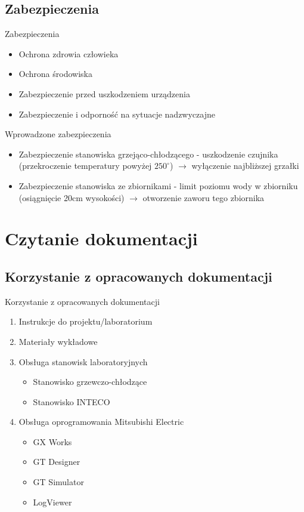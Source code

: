 \documentclass{beamer}
\begin{document}
	\subsection{Zabezpieczenia}
	\begin{frame}{Zabezpieczenia}
		\begin{itemize}
			\item Ochrona zdrowia człowieka
			\item Ochrona środowiska
			\item Zabezpieczenie przed uszkodzeniem urządzenia
			\item Zabezpieczenie i odporność na sytuacje nadzwyczajne
		\end{itemize}
		\begin{block}{Wprowadzone zabezpieczenia}
			\begin{itemize}
				\item Zabezpieczenie stanowiska grzejąco-chłodzącego - uszkodzenie czujnika (przekroczenie temperatury powyżej $250^\circ$) $\rightarrow$ wyłączenie najbliższej grzałki
				\item Zabezpieczenie stanowiska ze zbiornikami - limit poziomu wody w zbiorniku (osiągnięcie 20cm wysokości) $\rightarrow$ otworzenie zaworu tego zbiornika
			\end{itemize}
		\end{block}
	\end{frame}

\section{Czytanie dokumentacji}

	\subsection{Korzystanie z opracowanych dokumentacji}
	\begin{frame}{Korzystanie z opracowanych dokumentacji}
		\begin{enumerate}
			\item Instrukcje do projektu/laboratorium
			\item Materiały wykładowe
			\item Obsługa stanowisk laboratoryjnych
			\begin{itemize}
				\item Stanowisko grzewczo-chłodzące
				\item Stanowisko INTECO
			\end{itemize}
			\item Obsługa oprogramowania Mitsubishi Electric
			\begin{itemize}
				\item GX Works
				\item GT Designer
				\item GT Simulator
				\item LogViewer
			\end{itemize}
		\end{enumerate}
	\end{frame}
\end{document}
